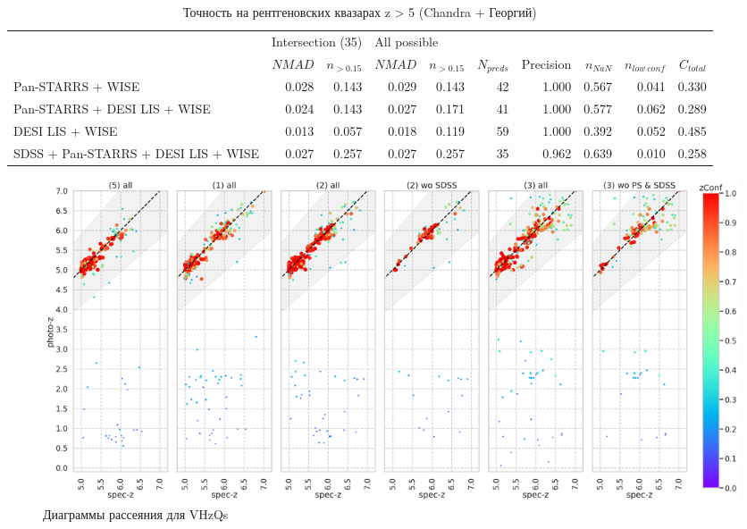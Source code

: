 \documentclass[fleqn,usenatbib]{mnras}
\begin{document}
\begin{table}
	\begin{tabular}{lrrrrrrrrr}
            \hline
            {} & \multicolumn{2}{l}{Intersection (35)} & \multicolumn{7}{l}{All possible} \\
            {} &            $NMAD$ & $n_{>0.15}$ &       $NMAD$ & $n_{>0.15}$ & $N_{preds}$ & Precision & $n_{NaN}$ & $n_{low~conf}$ & $C_{total}$ \\
            \hline
            Pan-STARRS + WISE                   &             0.028 &       0.143 &        0.029 &       0.143 &          42 &     1.000 &     0.567 &          0.041 &       0.330 \\
            Pan-STARRS + DESI LIS + WISE        &             0.024 &       0.143 &        0.027 &       0.171 &          41 &     1.000 &     0.577 &          0.062 &       0.289 \\
            DESI LIS + WISE                     &             0.013 &       0.057 &        0.018 &       0.119 &          59 &     1.000 &     0.392 &          0.052 &       0.485 \\
            SDSS + Pan-STARRS + DESI LIS + WISE &             0.027 &       0.257 &        0.027 &       0.257 &          35 &     0.962 &     0.639 &          0.010 &       0.258 \\
            \hline
            \end{tabular}
            \caption{Точность на рентгеновских квазарах z > 5 (Chandra + Георгий)}
\end{table}

\begin{figure}
    \centering
    \includegraphics[width=0.9\linewidth]{images/vhzqs-gr5.png}
    \caption{Диаграммы рассеяния для VHzQs}
    \label{fig:vhzqs-gr5}
\end{figure}
\end{document}
